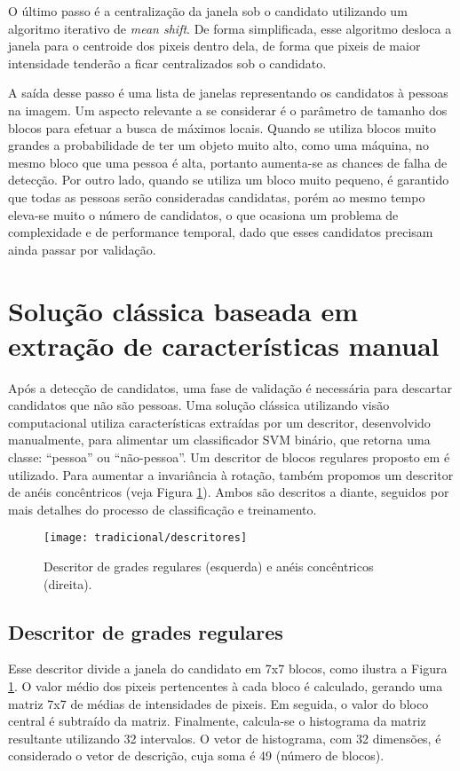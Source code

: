     O último passo é a centralização da janela sob o candidato utilizando um algoritmo iterativo de \textit{mean shift}. De forma simplificada, esse algoritmo desloca a janela para o centroide dos pixeis dentro dela, de forma que pixeis de maior intensidade tenderão a ficar centralizados sob o candidato.

    A saída desse passo é uma lista de janelas representando os candidatos à pessoas na imagem. Um aspecto relevante a se considerar é o parâmetro de tamanho dos blocos para efetuar a busca de máximos locais. Quando se utiliza blocos muito grandes a probabilidade de ter um objeto muito alto, como uma máquina, no mesmo bloco que uma pessoa é alta, portanto aumenta-se as chances de falha de detecção. Por outro lado, quando se utiliza um bloco muito pequeno, é garantido que todas as pessoas serão consideradas candidatas, porém ao mesmo tempo eleva-se muito o número de candidatos, o que ocasiona um problema de complexidade e de performance temporal, dado que esses candidatos precisam ainda passar por validação.

\section{Solução clássica baseada em extração de características manual}
\label{sec:classical}

    Após a detecção de candidatos, uma fase de validação é necessária para descartar candidatos que não são pessoas. Uma solução clássica utilizando visão computacional \cite{rauter} utiliza características extraídas por um descritor, desenvolvido manualmente, para alimentar um classificador SVM binário, que retorna uma classe: ``pessoa'' ou ``não-pessoa''. Um descritor de blocos regulares proposto em \cite{rauter} é utilizado. Para aumentar a invariância à rotação, também propomos um descritor de anéis concêntricos (veja Figura \ref{fig:descriptors}). Ambos são descritos a diante, seguidos por mais detalhes do processo de classificação e treinamento.

    \begin{figure}
    \centering
    \texttt{[image: tradicional/descritores]}
    \caption{Descritor de grades regulares (esquerda) e anéis concêntricos (direita).}
    \label{fig:descriptors}
    \end{figure}

    \subsection{Descritor de grades regulares}
      Esse descritor divide a janela do candidato em 7x7 blocos, como ilustra a Figura \ref{fig:descriptors}. O valor médio dos pixeis pertencentes à cada bloco é calculado, gerando uma matriz 7x7 de médias de intensidades de pixeis. Em seguida, o valor do bloco central é subtraído da matriz. Finalmente, calcula-se o histograma da matriz resultante utilizando 32 intervalos. O vetor de histograma, com 32 dimensões, é considerado o vetor de descrição, cuja soma é 49 (número de blocos).

